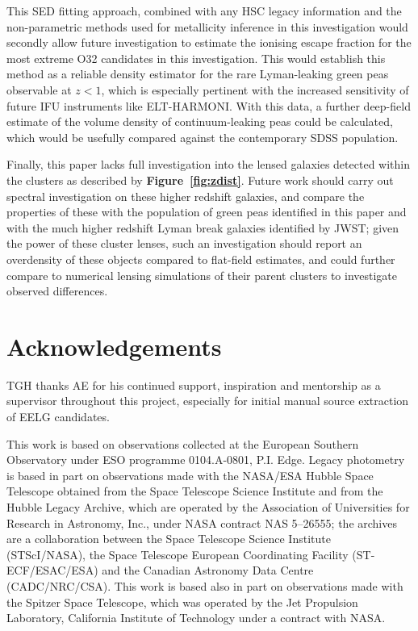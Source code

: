 \documentclass[fleqn,usenatbib]{mnras}
\begin{document}
This SED fitting approach, combined with any HSC legacy information and the non-parametric methods used for metallicity inference in this investigation would secondly allow future investigation to estimate the ionising escape fraction for the most extreme O32 candidates in this investigation. This would establish this method as a reliable density estimator for the rare Lyman-leaking green peas observable at $z<1$, which is especially pertinent with the increased sensitivity of future IFU instruments like ELT-HARMONI. With this data, a further deep-field estimate of the volume density of continuum-leaking peas could be calculated, which would be usefully compared against the contemporary \cite{izotov_2016} SDSS population. 

Finally, this paper lacks full investigation into the lensed galaxies detected within the clusters as described by \textbf{Figure~\ref{fig:zdist}}. Future work should carry out spectral investigation on these higher redshift galaxies, and compare the properties of these with the population of green peas identified in this paper and with the much higher redshift Lyman break galaxies identified by JWST; given the power of these cluster lenses, such an investigation should report an overdensity of these objects compared to flat-field estimates, and could further compare to numerical lensing simulations of their parent clusters to investigate observed differences.




\section*{Acknowledgements}

TGH thanks AE for his continued support, inspiration and mentorship as a supervisor throughout this project, especially for initial manual source extraction of EELG candidates.

This work is based on observations collected at the European Southern Observatory under ESO programme 0104.A-0801, P.I. Edge. Legacy photometry is based in part on observations made with the NASA/ESA Hubble Space Telescope obtained from the Space Telescope Science Institute and from the Hubble Legacy Archive, which are operated by the Association of Universities for Research in Astronomy, Inc., under NASA contract NAS 5–26555; the archives are a collaboration between the Space Telescope Science Institute (STScI/NASA), the Space Telescope European Coordinating Facility (ST-ECF/ESAC/ESA) and the Canadian Astronomy Data Centre (CADC/NRC/CSA). This work is based also in part on observations made with the Spitzer Space Telescope, which was operated by the Jet Propulsion Laboratory, California Institute of Technology under a contract with NASA.
\end{document}
